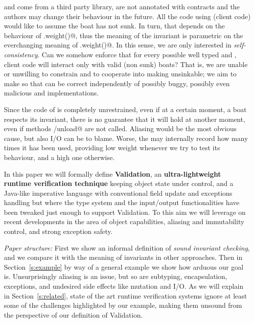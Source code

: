 \Q@Item@ and \Q@Items@ come from a third party library,  are not annotated with contracts and the authors may change their behaviour in the future.
All the code using \Q@Boat@  (client code) would like to 
assume the boat has not sunk.
In turn, that depends on the behaviour of \Q@Items.weight()@, thus the meaning of the \Q@Boat@ invariant is parametric on the everchanging meaning of  \Q@Items.weight()@.
In this sense, we are only interested in \emph{self-consistency}.
Can we somehow enforce that for every possible well typed \Q@Item@ and \Q@Items@, client code will interact only with valid (non sunk)  boats?
That is, we are unable or unwilling to constrain \Q@Item@ and \Q@Items@ to
cooperate into making \Q@Boat@s unsinkable; we aim
to make so that \Q@Boat@s can be correct independently of
possibly buggy, possibly even malicious \Q@Item@ and \Q@Items@ implementations.

Since the code of \Q@Items@ is completely unrestrained, 
even if at a certain moment, a boat respects its
invariant, there is no guarantee that
it will hold at another moment,
even if methods \Q@load/unload@ are not called.
Aliasing would be the most obvious cause, but also I/O can be to blame.
Worse, the \Q@cargo@ may internally record how many times
it has been used, providing low weight whenever we try to test its behaviour, and a high one otherwise.


In this paper we will formally define  \textbf{Validation}, an \textbf{ultra-lightweight runtime verification technique} 
 keeping object state under control, and 
 a Java-like imperative language
 with conventional field update and exceptions handling
 but where the type system and the input/output functionalities
 have been tweaked just enough to support Validation.
 To this aim we will leverage on recent developments in the area of object capabilities,
 aliasing and immutability control, and strong exception safety.






\noindent\textit{Paper structure:}
First we show an informal definition of \emph{sound invariant checking}, and we compare it with 
the meaning of invariants in other approaches.
Then in Section~\ref{s:example} by way of a general example we show how arduous our goal is.
Unsurprisingly aliasing is an issue, but so are subtyping, encapsulation, exceptions, and undesired side effects like mutation and I/O.
As we will explain in Section~\ref{s:related}, state of the art runtime verification systems
ignore at least some of the challenges highlighted by our example,
making them unsound from the perspective of our definition of Validation.

